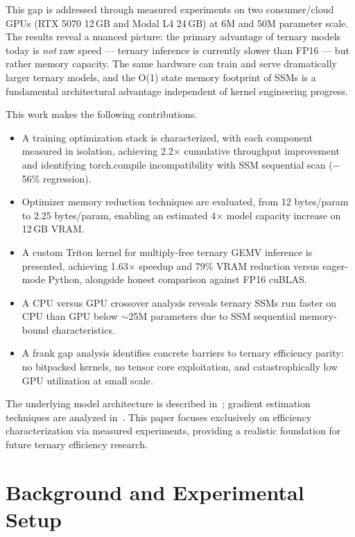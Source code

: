 \documentclass{article}
\begin{document}
This gap is addressed through measured experiments on two consumer/cloud GPUs (RTX 5070 12\,GB and Modal L4 24\,GB) at 6M and 50M parameter scale. The results reveal a nuanced picture: the primary advantage of ternary models today is \emph{not} raw speed --- ternary inference is currently slower than FP16 --- but rather memory capacity. The same hardware can train and serve dramatically larger ternary models, and the O(1) state memory footprint of SSMs is a fundamental architectural advantage independent of kernel engineering progress.

This work makes the following contributions.

\begin{itemize}
\item A training optimization stack is characterized, with each component measured in isolation, achieving 2.2$\times$ cumulative throughput improvement and identifying torch.compile incompatibility with SSM sequential scan ($-$56\% regression).

\item Optimizer memory reduction techniques are evaluated, from 12 bytes/param to 2.25 bytes/param, enabling an estimated 4$\times$ model capacity increase on 12\,GB VRAM.

\item A custom Triton kernel for multiply-free ternary GEMV inference is presented, achieving 1.63$\times$ speedup and 79\% VRAM reduction versus eager-mode Python, alongside honest comparison against FP16 cuBLAS.

\item A CPU versus GPU crossover analysis reveals ternary SSMs run faster on CPU than GPU below $\sim$25M parameters due to SSM sequential memory-bound characteristics.

\item A frank gap analysis identifies concrete barriers to ternary efficiency parity: no bitpacked kernels, no tensor core exploitation, and catastrophically low GPU utilization at small scale.
\end{itemize}

The underlying model architecture is described in~\citep{jou2026ternary}; gradient estimation techniques are analyzed in~\citep{jou2026gradient}. This paper focuses exclusively on efficiency characterization via measured experiments, providing a realistic foundation for future ternary efficiency research.

\section{Background and Experimental Setup}
\end{document}
